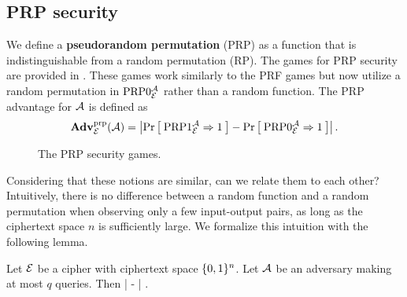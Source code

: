 \subsection{PRP security} 
We define a \textbf{pseudorandom permutation} (PRP) as a function that is indistinguishable from a random permutation (RP). The games for PRP security are provided in . These games work similarly to the PRF games but now utilize a random permutation in $\textnormal{PRP}0_{\cal E}^{\mathcal A}$ rather than a random function. The PRP advantage for ${\mathcal A}$ is defined as 
\begin{equation*}
\mathbf{Adv}^{\mathrm{prp}}_{{\cal E}}({\mathcal A}) = \left| \Pr\left[\: \textnormal{PRP}1_{\cal E}^{\mathcal A}\Rightarrow 1 \:\right] 
- \Pr\left[\: \textnormal{PRP}0_{\cal E}^{\mathcal A}\Rightarrow1 \:\right] \right|.
\end{equation*}

\begin{figure}
	\centering
\caption{The PRP security games.}
\label{fig:prp}	
\end{figure}

Considering that these notions are similar, can we relate them to each other? Intuitively, there is no difference between a random function and a random permutation when observing only a few input-output pairs, as long as the ciphertext space $n$ is sufficiently large. We formalize this intuition with the following lemma. 

\begin{lem}
	\label{switching-lem}
	Let ${\cal E}$ be a cipher with ciphertext space $\{0,1\}^n$. 
	Let ${\mathcal A}$ be an adversary making at most $q$ queries. Then
	\bnm
	\left|  
	-  \right| \le {}  \;.
	\enm
\end{lem}

